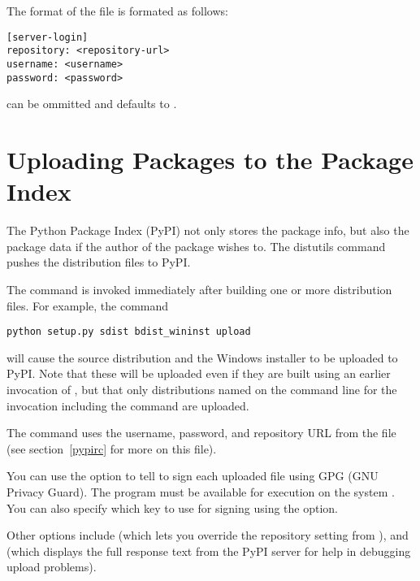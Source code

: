 \documentclass{manual}
\begin{document}
The format of the  file is formated as follows:

\begin{verbatim}
[server-login]
repository: <repository-url>
username: <username>
password: <password>
\end{verbatim}

 can be ommitted and defaults to
.

\chapter{Uploading Packages to the Package Index}
\label{package-upload}


The Python Package Index (PyPI) not only stores the package info, but also 
the package data if the author of the package wishes to. The distutils
command  pushes the distribution files to PyPI.

The command is invoked immediately after building one or more distribution
files.  For example, the command

\begin{verbatim}
python setup.py sdist bdist_wininst upload
\end{verbatim}

will cause the source distribution and the Windows installer to be
uploaded to PyPI.  Note that these will be uploaded even if they are
built using an earlier invocation of , but that only
distributions named on the command line for the invocation including
the  command are uploaded.

The  command uses the username, password, and repository
URL from the  file (see section~\ref{pypirc} for
more on this file).

You can use the  option to tell  to
sign each uploaded file using GPG (GNU Privacy Guard).  The 
 program must be available for execution on the system
.  You can also specify which key to use for signing
using the  option.

Other  options include 
 (which lets you override the
repository setting from ), and
 (which displays the full response text
from the PyPI server for help in debugging upload problems).
\end{document}
